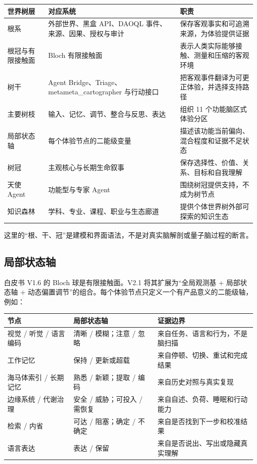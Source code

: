 \documentclass[UTF8,a4paper,11pt]{ctexart}
\begin{document}
\begin{center}
\begin{longtable}{@{}p{3.2cm}p{5.1cm}p{5.0cm}@{}}
\toprule
\textbf{世界树层} & \textbf{对应系统} & \textbf{职责} \\
\midrule
根系 & 外部世界、黑盒 API、DAOQL 事件、来源、因果、授权与审计 & 保存客观事实和可追溯来源，为体验提供证据 \\
根冠与有限接触面 & Bloch 有限接触面 & 表示人类实际能够接触、测量和压缩的客观环境 \\
树干 & Agent Bridge、Triage、metameta\_cartographer 与行动接口 & 把客观事件翻译为可更正体验，并选择支持路径 \\
主要树枝 & 输入、记忆、调节、整合与反思、表达 & 组织 11 个功能脑区式体验分区 \\
局部状态轴 & 每个体验节点的二能级变量 & 描述该功能当前偏向、混合程度和证据不足状态 \\
树冠 & 主观核心与长期生命叙事 & 保存选择性、价值、关系、目标和自我理解 \\
天使 Agent & 功能型与专家 Agent & 围绕树冠提供支持，不成为树节点 \\
知识森林 & 学科、专业、课程、职业与生态廊道 & 提供个体世界树外部可探索的知识生态 \\
\bottomrule
\end{longtable}
\end{center}

这里的“根、干、冠”是建模和界面语法，不是对真实脑解剖或量子脑过程的断言。

\subsection{局部状态轴}

白皮书 V1.6 的 Bloch 球是有限接触面。V2.1 将其扩展为“全局观测基 + 局部状态轴 + 动态偏置调节”的组合。每个体验节点只定义一个有产品意义的二能级轴，例如：

\begin{center}
\begin{longtable}{@{}p{4.3cm}p{4.0cm}p{5.0cm}@{}}
\toprule
\textbf{节点} & \textbf{局部状态轴} & \textbf{证据边界} \\
\midrule
视觉 / 听觉 / 语言编码 & 清晰 / 模糊；注意 / 忽略 & 来自任务、语言和行为，不是脑扫描 \\
工作记忆 & 保持 / 更新或超载 & 来自停顿、切换、重试和完成结果 \\
海马体索引 / 长期记忆 & 熟悉 / 新颖；提取 / 编码 & 来自历史对照与真实复现 \\
边缘系统 / 代谢治理 & 安全 / 威胁；可投入 / 需恢复 & 来自自述、负荷、睡眠和行动能力 \\
检索 / 内省 & 可达 / 阻塞；确定 / 不确定 & 来自是否找到下一步和校准结果 \\
语言表达 & 表达 / 保留 & 来自是否说出、写出或隐藏真实理解 \\
\bottomrule
\end{longtable}
\end{center}
\end{document}

